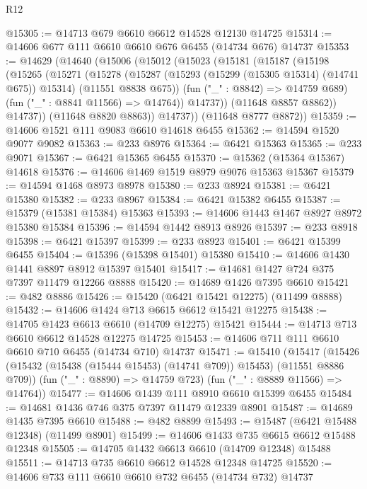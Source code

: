 \begin{lexlean}{R12}
\begin{coremodule}
{{{{{{{{{{{{{{{{{{{{{{{{{{{{{{{{{{{{{{{{{{{{{{{{{{{{{{{{{{{{{{{{{{{{{{{{{{{{{{{{{{@15305 := @14713 @679 @6610 @6612 @14528 @12130 @14725
@15314 := @14606 @677 @111 @6610 @6610 @676 @6455 (@14734 @676) @14737
@15353 := @14629
    (@14640
      (@15006
        (@15012
          (@15023
            (@15181
              (@15187
                (@15198
                  (@15265
                    (@15271
                      (@15278
                        (@15287
                          (@15293 (@15299 (@15305 @15314) (@14741 @675)) @15314)
                          (@11551 @8838 @675))
                        (fun ("_" : @8842) => @14759 @689)
                        (fun ("_" : @8841 @11566) => @14764))
                      @14737))
                  (@11648 @8857 @8862))
                @14737))
            (@11648 @8820 @8863))
          @14737))
      (@11648 @8777 @8872))
@15359 := @14606 @1521 @111 @9083 @6610 @14618 @6455
@15362 := @14594 @1520 @9077 @9082
@15363 := @233 @8976
@15364 := @6421 @15363
@15365 := @233 @9071
@15367 := @6421 @15365 @6455
@15370 := @15362 (@15364 @15367) @14618
@15376 := @14606 @1469 @1519 @8979 @9076 @15363 @15367
@15379 := @14594 @1468 @8973 @8978
@15380 := @233 @8924
@15381 := @6421 @15380
@15382 := @233 @8967
@15384 := @6421 @15382 @6455
@15387 := @15379 (@15381 @15384) @15363
@15393 := @14606 @1443 @1467 @8927 @8972 @15380 @15384
@15396 := @14594 @1442 @8913 @8926
@15397 := @233 @8918
@15398 := @6421 @15397
@15399 := @233 @8923
@15401 := @6421 @15399 @6455
@15404 := @15396 (@15398 @15401) @15380
@15410 := @14606 @1430 @1441 @8897 @8912 @15397 @15401
@15417 := @14681 @1427 @724 @375 @7397 @11479 @12266 @8888
@15420 := @14689 @1426 @7395 @6610
@15421 := @482 @8886
@15426 := @15420 (@6421 @15421 @12275) (@11499 @8888)
@15432 := @14606 @1424 @713 @6615 @6612 @15421 @12275
@15438 := @14705 @1423 @6613 @6610 (@14709 @12275) @15421
@15444 := @14713 @713 @6610 @6612 @14528 @12275 @14725
@15453 := @14606 @711 @111 @6610 @6610 @710 @6455 (@14734 @710) @14737
@15471 := @15410
    (@15417
      (@15426 (@15432 (@15438 (@15444 @15453) (@14741 @709)) @15453) (@11551 @8886 @709))
      (fun ("_" : @8890) => @14759 @723)
      (fun ("_" : @8889 @11566) => @14764))
@15477 := @14606 @1439 @111 @8910 @6610 @15399 @6455
@15484 := @14681 @1436 @746 @375 @7397 @11479 @12339 @8901
@15487 := @14689 @1435 @7395 @6610
@15488 := @482 @8899
@15493 := @15487 (@6421 @15488 @12348) (@11499 @8901)
@15499 := @14606 @1433 @735 @6615 @6612 @15488 @12348
@15505 := @14705 @1432 @6613 @6610 (@14709 @12348) @15488
@15511 := @14713 @735 @6610 @6612 @14528 @12348 @14725
@15520 := @14606 @733 @111 @6610 @6610 @732 @6455 (@14734 @732) @14737
}}}}}}}}}}}}}}}}}}}}}}}}}}}}}}}}}}}}}}}}}}}}}}}}}}}}}}}}}}}}}}}}}}}}}}}}}}}}}}}}}}
\end{coremodule}
\end{lexlean}
